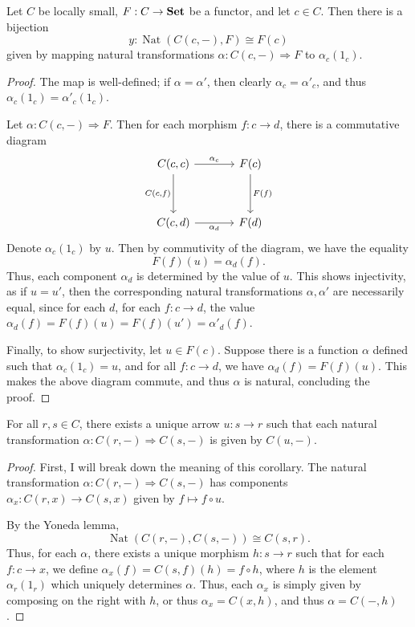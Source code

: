 \begin{lemma}[Yoneda]\label{lma:3.1}
	Let $C$ be locally small, $F : C \to \mathbf{Set} $ be a functor, and let $c\in C$. Then there is a bijection
	\[
		y: \operatorname{Nat} (C(c,-),F)\cong F(c)
	\]
	given by mapping natural transformations $\alpha : C(c,-) \Rightarrow F$ to $\alpha_c(1_c)$.
\end{lemma}
\begin{proof}
	The map is well-defined; if $\alpha=\alpha '$, then clearly $\alpha _c=\alpha '_c$, and thus $\alpha _c(1_c)=\alpha '_c(1_c)$.

	Let $\alpha : C(c,-) \Rightarrow F$. Then for each morphism $f : c \to d$, there is a commutative diagram
	\[\begin{tikzcd}[row sep = 3.5em, column sep = 3.5em]
	C(c,c)\ar[" \alpha _c ", r] \ar[" C(c\text{,} f) "', d]  & F(c)\ar[" F(f) ", d]  \\
	C(c,d)\ar[" \alpha _d "', r]  & F(d)
	\end{tikzcd}\]
	Denote $\alpha _c(1_c)$ by $u$. Then by commutivity of the diagram, we have the equality
	\[
		F(f)(u)=\alpha _d(f)
	.\]
	Thus, each component $\alpha _d$ is determined by the value of $u$. This shows injectivity, as if $u=u'$, then the corresponding natural transformations $\alpha ,\alpha '$ are necessarily equal, since for each $d$, for each $f : c \to d$, the value $\alpha _d(f)=F(f)(u)=F(f)(u')=\alpha '_d(f)$.

	Finally, to show surjectivity, let $u\in F(c)$. Suppose there is a function $\alpha $ defined such that $\alpha _c(1_c)=u$, and for all $f : c \to d$, we have $\alpha _d(f)=F(f)(u)$. This makes the above diagram commute, and thus $\alpha $ is natural, concluding the proof.
\end{proof}

\begin{corollary}\label{cor:3.2}
	For all $r,s\in C$, there exists a unique arrow $u : s \to r$ such that each natural transformation $\alpha : C(r,-) \Rightarrow C(s,-)$ is given by $C(u,-)$.
\end{corollary}
\begin{proof}
	First, I will break down the meaning of this corollary. The natural transformation $\alpha : C(r,-) \Rightarrow C(s,-)$ has components $\alpha _x : C(r,x) \to C(s,x)$ given by $f\mapsto f\circ u$.

	By the Yoneda lemma,
	\[
		\operatorname{Nat} (C(r,-),C(s,-))\cong C(s,r)
	.\]
	Thus, for each $\alpha $, there exists a unique morphism $h : s \to r$ such that for each $f : c \to x$, we define $\alpha _x(f)=C(s,f)(h)=f\circ h$, where $h$ is the element $\alpha _r(1_r)$ which uniquely determines $\alpha $. Thus, each $\alpha _x$ is simply given by composing on the right with $h$, or thus $\alpha _x=C(x,h)$, and thus $\alpha =C(-,h)$.
\end{proof}

